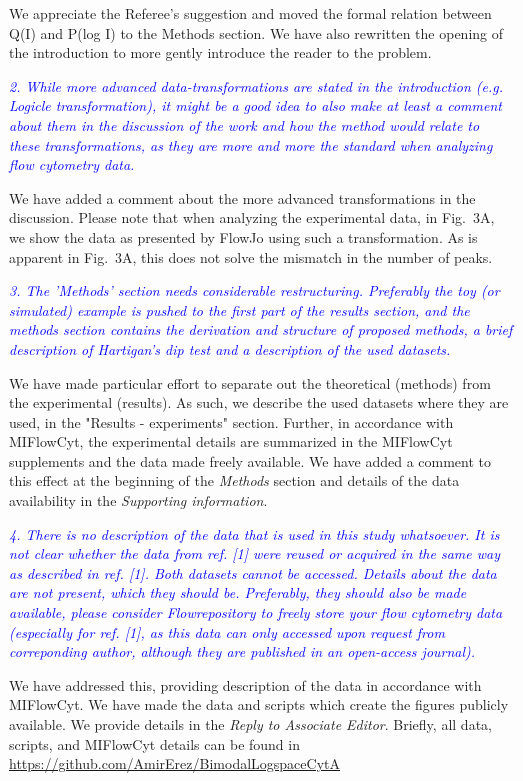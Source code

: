 \documentclass[letter,11pt,draft]{article}
\newcommand{\re}[1]{\emph{\textcolor{blue}{#1}}}
\begin{document}
\smallskip
We appreciate the Referee's suggestion and moved the formal relation between Q(I) and P(log I) to the Methods section. We have also rewritten the opening of the introduction to more gently introduce the reader to the problem. 

\re{2. While more advanced data-transformations are stated in the introduction (e.g. Logicle transformation), it might be a good idea to also make at least a comment about them in the discussion of the work and how the method would relate to these transformations, as they are more and more the standard when analyzing flow cytometry data.}

\smallskip
We have added a comment about the more advanced transformations in the discussion. Please note that when analyzing the experimental data, in Fig.~3A, we show the data as presented by FlowJo using such a transformation. As is apparent in Fig.~3A, this does not solve the mismatch in the number of peaks. 

\re{3. The 'Methods' section needs considerable restructuring. Preferably the toy (or simulated) example is pushed to the first part of the results section, and the methods section contains the derivation and structure of proposed methods, a brief description of Hartigan's dip test and a description of the used datasets.}

\smallskip
We have made particular effort to separate out the theoretical (methods) from the experimental (results). As such, we describe the used datasets where they are used, in the "Results - experiments" section. Further, in accordance with MIFlowCyt, the experimental details are summarized in the MIFlowCyt supplements and the data made freely available. We have added a comment to this effect at the beginning of the \emph{Methods} section and details of the data availability in the \emph{Supporting information}.

\re{4. There is no description of the data that is used in this study whatsoever. It is not clear whether the data from ref. [1] were reused or acquired in the same way as described in ref. [1]. Both datasets cannot be accessed. Details about the data are not present, which they should be. Preferably, they should also be made available, please consider Flowrepository to freely store your flow cytometry data (especially for ref. [1], as this data can only accessed upon request from correponding author, although they are published in an open-access journal).}

\smallskip
We have addressed this, providing description of the data in accordance with MIFlowCyt. We have made the data and scripts which create the figures publicly available. We provide details in the \emph{Reply to Associate Editor}. Briefly, all data, scripts, and MIFlowCyt details can be found in
\href{https://github.com/AmirErez/BimodalLogspaceCytA}{https://github.com/AmirErez/BimodalLogspaceCytA}
\end{document}
